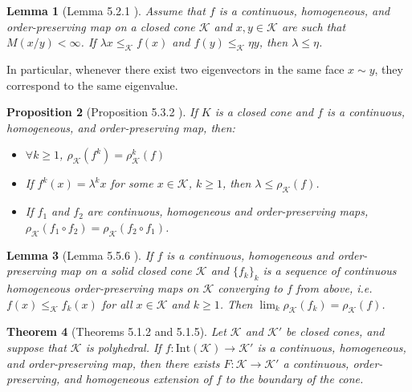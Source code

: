 \documentclass{article}
\newtheorem{theorem}{Theorem}[section]
\newtheorem{lemma}[theorem]{Lemma}
\newtheorem{proposition}[theorem]{Proposition}
\newcommand{\cradius}{\rho_{\cone}}
\newcommand{\cone}{\mathcal{K}}
\newcommand{\interior}{\mathrm{Int}}
\newcommand{\cleq}{\leq_{\cone}}
\begin{document}
\begin{lemma}[Lemma 5.2.1 \cite{lemmens2012nonlinear}]\label{Lemma_comparison_eigenvalues}
Assume that $f$ is a continuous, homogeneous, and order-preserving map on a closed cone $\cone$ and $x,y\in\cone$ are such that $M(x/y)<\infty$. If $\lambda x\cleq f(x)$ and $f(y)\cleq \eta y$, then $\lambda\leq \eta$. 
\end{lemma}
In particular, whenever there exist two eigenvectors in the same face $x\sim y$, they correspond to the same eigenvalue.




%
\begin{proposition}[Proposition 5.3.2 \cite{lemmens2012nonlinear}]\label{Prop_properties_cone_spectral_radius}
If $K$ is a closed cone and $f$ is a continuous, homogeneous, and order-preserving map, then: 
\begin{itemize}
    \item $\forall k\geq 1$, $\cradius(f^k)=\cradius^k(f)$
    \item  If $f^k(x)=\lambda^k x$ for some $x\in\cone$, $k\geq 1$, then $\lambda\leq \cradius(f)$.
    \item If $f_1$ and $f_2$ are continuous, homogeneous and order-preserving maps, $\cradius(f_1\circ f_2)=\cradius(f_2\circ f_1)$.
\end{itemize}
\end{proposition}

\begin{lemma}[Lemma 5.5.6 \cite{lemmens2012nonlinear}]\label{Continuity_of_spectral_radius_from_above}
    If $f$ is a continuous, homogeneous and order-preserving map on a solid closed cone $\cone$ and $\{f_k\}_{k}$ is a sequence of continuous homogeneous order-preserving maps on $\cone$ converging to $f$ from above, i.e. $f(x)\cleq f_k(x)$ for all $x\in \cone$ and $k\geq 1$. Then $\lim_{k}\cradius(f_k)=\cradius(f)$.
\end{lemma}


\begin{theorem}[Theorems 5.1.2 and 5.1.5]\label{Thm_extension_of_order_preserving_functions}
Let $\cone$ and $\cone'$ be closed cones, and suppose that $\cone$ is polyhedral. If $f:\interior(\cone)\rightarrow \cone'$ is a continuous, homogeneous, and order-preserving map, then there exists $F:\cone\rightarrow\cone'$ a continuous, order-preserving, and homogeneous extension of $f$ to the boundary of the cone.
\end{theorem}
\end{document}
